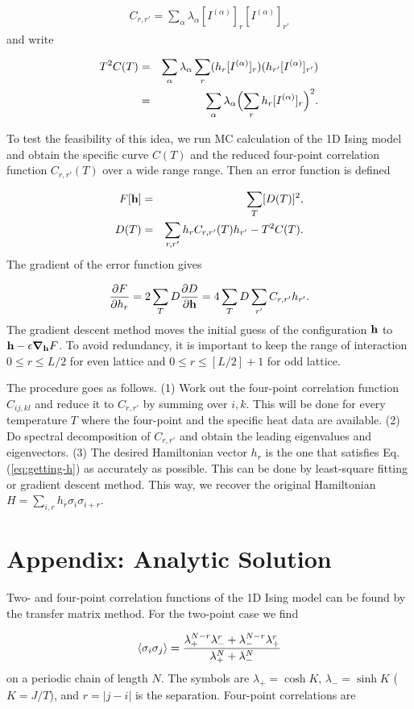 \documentclass[reprint,amsmath,amssymb,aps,showpacs,superscriptaddress,prb]{revtex4-1}
\newcommand{\ba}{\begin{eqnarray}}
\newcommand{\ea}{\end{eqnarray}}
\renewcommand{\v}[1]{{\bf #1}}
\newcommand{\nn}{\nonumber \\}
\begin{document}
\ba C_{r,r'} = \sum_\alpha \lambda_\alpha [ I^{(\alpha)} ]_r [ I^{(\alpha)} ]_{r'} \ea
and write

\ba T^2 C(T) &=& \sum_\alpha \lambda_\alpha \sum_r (h_r [ I^{(\alpha)} ]_r ) (h_{r'} [ I^{(\alpha)} ]_{r'} ) \nn
%
& =& \sum_\alpha \lambda_\alpha \Bigl( \sum_r h_r [ I^{(\alpha)} ]_r \Bigr)^2 . \label{eq:getting-h}   \ea

To test the feasibility of this idea, we run MC calculation of the 1D Ising model and obtain the specific curve $C(T)$ and the reduced four-point correlation function $C_{r,r'}(T)$ over a wide range range. Then an error function is defined

\ba F[\v h] &=& \sum_T [D(T)]^2 , \nn
%
D(T) & = & \sum_{r,r'} h_r C_{r,r'} (T) h_{r'} - T^2 C(T) . \ea
The gradient of the error function gives

\ba {\partial F \over \partial h_r } = 2 \sum_T D {\partial D\over \partial \v h} = 4 \sum_T D \sum_{r'}  C_{r,r'} h_{r'}  . \ea
The gradient descent method moves the initial guess of the configuration $\v h$ to $\v h - \epsilon \bm \nabla_{\v h} F$. To avoid redundancy, it is important to keep the range of interaction $0 \le r\le L/2$ for even lattice and $0\le r \le [L/2]+1$ for odd lattice. 


The procedure goes as follows. (1) Work out the four-point correlation function $C_{ij,kl}$ and reduce it to $C_{r,r'}$ by summing over $i,k$. This will be done for every temperature $T$ where the four-point and the specific heat data are available. (2) Do spectral decomposition of $C_{r,r'}$ and obtain the leading eigenvalues and eigenvectors. (3) The desired Hamiltonian vector $h_r$ is the one that satisfies Eq. (\ref{eq:getting-h}) as accurately as possible. This can be done by least-square fitting or gradient descent method. This way, we recover the original Hamiltonian $H= \sum_{i,r} h_r \sigma_i \sigma_{i+r}$.





\section{Appendix: Analytic Solution}
Two- and four-point correlation functions of the 1D Ising model can be found by the transfer matrix method. For the two-point case we find

\ba \langle \sigma_i \sigma_j \rangle = {\lambda_+^{N-r} \lambda_-^r + \lambda_-^{N-r} \lambda_+^r \over \lambda_+^N + \lambda_-^N} \ea
on a periodic chain of length $N$. The symbols are $\lambda_+ = \cosh K$, $\lambda_- = \sinh K$ ($K=J/T$), and $r=|j-i|$ is the separation. Four-point correlations are
\end{document}
